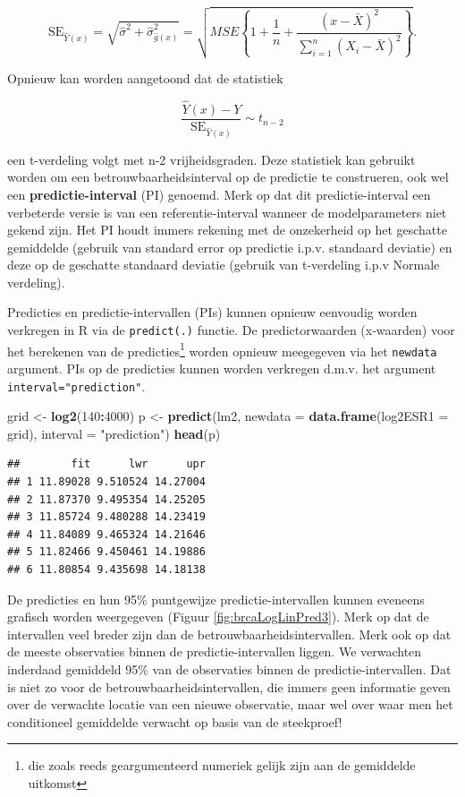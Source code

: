 \documentclass[
  12pt,dutch]{book}
\newenvironment{Shaded}{\begin{snugshade}}{\end{snugshade}}
\newcommand{\AttributeTok}[1]{\textcolor[rgb]{0.13,0.29,0.53}{#1}}
\newcommand{\DecValTok}[1]{\textcolor[rgb]{0.00,0.00,0.81}{#1}}
\newcommand{\FunctionTok}[1]{\textcolor[rgb]{0.13,0.29,0.53}{\textbf{#1}}}
\newcommand{\NormalTok}[1]{#1}
\newcommand{\OtherTok}[1]{\textcolor[rgb]{0.56,0.35,0.01}{#1}}
\newcommand{\SpecialCharTok}[1]{\textcolor[rgb]{0.81,0.36,0.00}{\textbf{#1}}}
\newcommand{\StringTok}[1]{\textcolor[rgb]{0.31,0.60,0.02}{#1}}
\theoremstyle{definition}
\theoremstyle{definition}
\theoremstyle{definition}
\theoremstyle{definition}
\theoremstyle{remark}
\begin{document}
\[\text{SE}_{\hat{Y}(x)}=\sqrt{\hat\sigma^2+\hat\sigma^2_{\hat{g}(x)}}=\sqrt{MSE\left\{1+\frac{1}{n}+\frac{(x-\bar X)^2}{\sum\limits_{i=1}^n (X_i-\bar X)^2}\right\}}.\]

Opnieuw kan worden aangetoond dat de statistiek

\[\frac{\hat{Y}(x)-Y}{\text{SE}_{\hat{Y}(x)}}\sim t_{n-2}\]

een t-verdeling volgt met n-2 vrijheidsgraden.
Deze statistiek kan gebruikt worden om een betrouwbaarheidsinterval op de predictie te construeren, ook wel een \textbf{predictie-interval} (PI) genoemd.
Merk op dat dit predictie-interval een verbeterde versie is van een referentie-interval wanneer de modelparameters niet gekend zijn. Het PI houdt immers rekening met de onzekerheid op het geschatte gemiddelde (gebruik van standard error op predictie i.p.v. standaard deviatie) en deze op de geschatte standaard deviatie (gebruik van t-verdeling i.p.v Normale verdeling).

Predicties en predictie-intervallen (PIs) kunnen opnieuw eenvoudig worden verkregen in R via de \texttt{predict(.)} functie.
De predictorwaarden (x-waarden) voor het berekenen van de predicties\footnote{die zoals reeds geargumenteerd numeriek gelijk zijn aan de gemiddelde uitkomst} worden opnieuw meegegeven via het \texttt{newdata} argument.
PIs op de predicties kunnen worden verkregen d.m.v. het argument \texttt{interval="prediction"}.

\begin{Shaded}
\begin{Highlighting}[]
\NormalTok{grid }\OtherTok{\textless{}{-}} \FunctionTok{log2}\NormalTok{(}\DecValTok{140}\SpecialCharTok{:}\DecValTok{4000}\NormalTok{)}
\NormalTok{p }\OtherTok{\textless{}{-}} \FunctionTok{predict}\NormalTok{(lm2, }\AttributeTok{newdata =} \FunctionTok{data.frame}\NormalTok{(}\AttributeTok{log2ESR1 =}\NormalTok{ grid),}
    \AttributeTok{interval =} \StringTok{"prediction"}\NormalTok{)}
\FunctionTok{head}\NormalTok{(p)}
\end{Highlighting}
\end{Shaded}

\begin{verbatim}
##        fit      lwr      upr
## 1 11.89028 9.510524 14.27004
## 2 11.87370 9.495354 14.25205
## 3 11.85724 9.480288 14.23419
## 4 11.84089 9.465324 14.21646
## 5 11.82466 9.450461 14.19886
## 6 11.80854 9.435698 14.18138
\end{verbatim}

De predicties en hun 95\% puntgewijze predictie-intervallen kunnen eveneens grafisch worden weergegeven (Figuur \ref{fig:brcaLogLinPred3}).
Merk op dat de intervallen veel breder zijn dan de betrouwbaarheidsintervallen.
Merk ook op dat de meeste observaties binnen de predictie-intervallen liggen.
We verwachten inderdaad gemiddeld 95\% van de observaties binnen de predictie-intervallen.
Dat is niet zo voor de betrouwbaarheidsintervallen, die immers geen informatie geven over de verwachte locatie van een nieuwe observatie, maar wel over waar men het conditioneel gemiddelde verwacht op basis van de steekproef!
\end{document}
